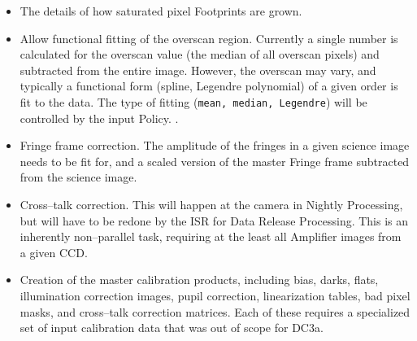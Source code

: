 \begin{itemize}

\item The details of how saturated pixel Footprints are grown.

\item Allow functional fitting of the overscan region.  Currently a
single number is calculated for the overscan value (the median of all
overscan pixels) and subtracted from the entire image.  However, the
overscan may vary, and typically a functional form (spline, Legendre
polynomial) of a given order is fit to the data.  The type of fitting
({\tt mean, median, Legendre}) will be controlled by the input Policy.
.

\item Fringe frame correction.  The amplitude of the fringes in a
given science image needs to be fit for, and a scaled version of the
master Fringe frame subtracted from the science image.

\item Cross--talk correction.  This will happen at the camera in
Nightly Processing, but will have to be redone by the ISR for Data
Release Processing.  This is an inherently non--parallel task,
requiring at the least all Amplifier images from a given CCD.

\item Creation of the master calibration products, including bias,
darks, flats, illumination correction images, pupil correction,
linearization tables, bad pixel masks, and cross--talk correction
matrices.  Each of these requires a specialized set of input
calibration data that was out of scope for DC3a.

\end{itemize}
